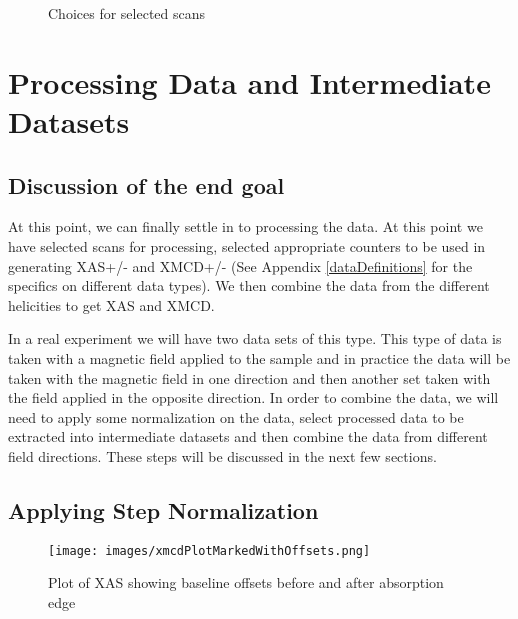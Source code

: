 \documentclass[12pt,letterpaper, openany]{book}
\begin{document}
\begin{figure}[htp]

\centering {}


\caption {Choices for selected scans}
\label{fig:selectionChoice}
\end{figure}

\section{Processing Data and Intermediate Datasets}
\subsection{Discussion of the end goal}
At this point, we can finally settle in to processing the data.  At this point
we have selected scans for processing, selected appropriate counters to be used
in generating XAS+/- and XMCD+/- (See Appendix \ref{dataDefinitions} for the
specifics on different data types).  We then combine the data from the different
helicities to get XAS and XMCD.

In a real experiment we will have two data sets of this type.  This type of data
is taken with a magnetic field applied to the sample and in practice the data
will be taken with the magnetic field in one direction and then another set
taken with the field applied in the opposite direction.  In order to combine the
data, we will need to apply some normalization on the data, select processed
data to be extracted into intermediate datasets and then combine the data from
different field directions.  These steps will be discussed in the next few
sections.

\subsection{Applying Step Normalization}\label{sec:stepNormalization}

\begin{figure}
\texttt{[image: images/xmcdPlotMarkedWithOffsets.png]}
\caption {Plot of XAS showing baseline offsets before and after absorption
edge}
\label{fig:xmcdStepNormalizeBefore}
\end{figure}
\end{document}
